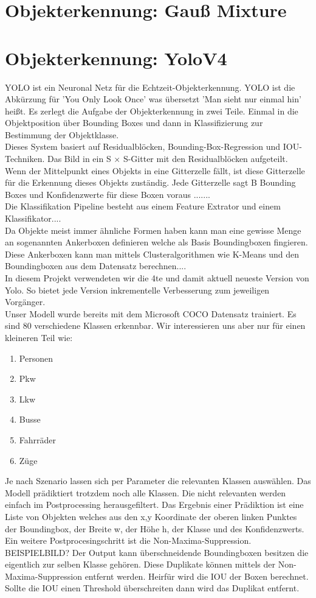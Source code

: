 \documentclass[conference]{IEEEtran}
\begin{document}
	\section{Objekterkennung: Gauß Mixture}
	
	\section{Objekterkennung: YoloV4}
	YOLO ist ein Neuronal Netz für die Echtzeit-Objekterkennung. YOLO ist die Abkürzung für 'You Only Look Once' was übersetzt 'Man sieht nur einmal hin' heißt. Es zerlegt die Aufgabe der Objekterkennung in zwei Teile. Einmal in die Objektposition über Bounding Boxes und dann in Klassifizierung zur Bestimmung der Objektklasse.\\
	Dieses System basiert auf Residualblöcken, Bounding-Box-Regression und IOU-Techniken.
	Das Bild in ein S × S-Gitter mit den Residualblöcken aufgeteilt. Wenn der Mittelpunkt eines Objekts in eine Gitterzelle fällt, ist diese Gitterzelle für die Erkennung dieses Objekts zuständig. Jede Gitterzelle sagt B Bounding Boxes und Konfidenzwerte für diese Boxen voraus \cite{b1}.......\\
	Die Klassifikation Pipeline besteht aus einem Feature Extrator und einem Klassifikator....\\
	Da Objekte meist immer ähnliche Formen haben kann man eine gewisse Menge an sogenannten Ankerboxen definieren welche als Basis Boundingboxen fingieren. Diese Ankerboxen kann man mittels Clusteralgorithmen wie K-Means und den Boundingboxen aus dem Datensatz berechnen....\\
	In diesem Projekt verwendeten wir die 4te und damit aktuell neueste Version von Yolo\cite{b2}. So bietet jede Version inkrementelle Verbesserung zum jeweiligen Vorgänger.\\
	Unser Modell wurde bereits mit dem Microsoft COCO Datensatz trainiert. Es sind 80 verschiedene Klassen erkennbar. Wir interessieren uns aber nur für einen kleineren Teil wie:
	\begin{enumerate}
		\item Personen
		\item Pkw
		\item Lkw
		\item Busse
		\item Fahrräder
		\item Züge
	\end{enumerate}
	Je nach Szenario lassen sich per Parameter die relevanten Klassen auswählen. Das Modell prädiktiert trotzdem noch alle Klassen. Die nicht relevanten werden einfach im Postprocessing herausgefiltert. Das Ergebnis einer Prädiktion ist eine Liste von Objekten welches aus den x,y Koordinate der oberen linken Punktes der Boundingbox, der Breite w, der Höhe h, der Klasse und des Konfidenzwerts.
	Ein weitere Postprocesingschritt ist die Non-Maxima-Suppression. BEISPIELBILD? Der Output kann überschneidende Boundingboxen besitzen die eigentlich zur selben Klasse gehören. Diese Duplikate können mittels der Non-Maxima-Suppression entfernt werden. Heirfür wird die IOU der Boxen berechnet. Sollte die IOU einen Threshold überschreiten dann wird das Duplikat entfernt.
	
\end{document}
